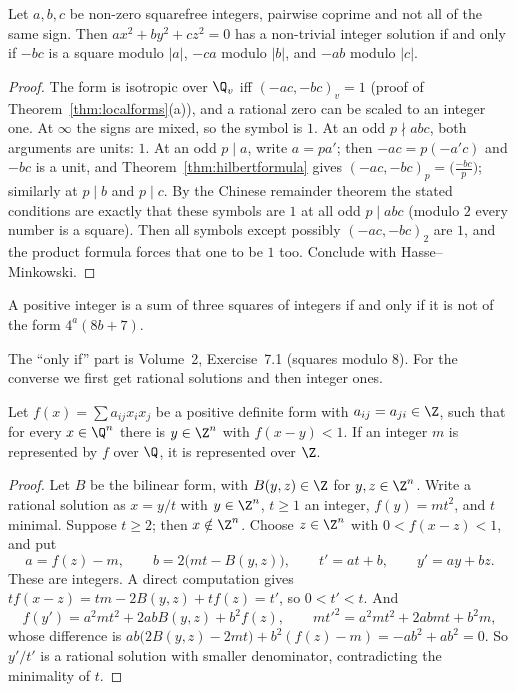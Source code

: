 \begin{theorem}[Legendre, 1785]\label{thm:legendre3}
Let $a,b,c$ be non-zero squarefree integers, pairwise coprime and not all of the same sign. Then $ax^2+by^2+cz^2=0$ has a
non-trivial integer solution if and only if $-bc$ is a square modulo $|a|$, $-ca$ modulo $|b|$, and $-ab$ modulo $|c|$.
\end{theorem}
\begin{proof}
The form is isotropic over $\Q_v$ iff $(-ac,-bc)_v=1$ (proof of Theorem~\ref{thm:localforms}(a)), and a rational zero can be scaled to
an integer one. At $\infty$ the signs are mixed, so the symbol is $1$. At an odd $p\nmid abc$, both arguments are units: $1$. At
an odd $p\mid a$, write $a=pa'$; then $-ac=p(-a'c)$ and $-bc$ is a unit, and Theorem~\ref{thm:hilbertformula} gives $(-ac,-bc)_p=
\bigl(\frac{-bc}p\bigr)$; similarly at $p\mid b$ and $p\mid c$. By the Chinese remainder theorem the stated conditions are exactly
that these symbols are $1$ at all odd $p\mid abc$ (modulo $2$ every number is a square). Then all symbols except possibly
$(-ac,-bc)_2$ are $1$, and the product formula forces that one to be $1$ too. Conclude with Hasse--Minkowski.
\end{proof}

\begin{theorem}\label{thm:threesq}
A positive integer is a sum of three squares of integers if and only if it is not of the form $4^a(8b+7)$.
\end{theorem}

The ``only if'' part is Volume~2, Exercise~7.1 (squares modulo $8$). For the converse we first get rational solutions and then
integer ones.

\begin{lemma}\label{lem:dc}
Let $f(x)=\sum a_{ij}x_ix_j$ be a positive definite form with $a_{ij}=a_{ji}\in\Z$, such that for every $x\in\Q^n$ there is $y\in
\Z^n$ with $f(x-y)<1$. If an integer $m$ is represented by $f$ over $\Q$, it is represented over $\Z$.
\end{lemma}
\begin{proof}
Let $B$ be the bilinear form, with $B(y,z)\in\Z$ for $y,z\in\Z^n$. Write a rational solution as $x=y/t$ with $y\in\Z^n$, $t\ge1$
an integer, $f(y)=mt^2$, and $t$ minimal. Suppose $t\ge2$; then $x\notin\Z^n$. Choose $z\in\Z^n$ with $0<f(x-z)<1$, and put
\[
a=f(z)-m,\qquad b=2\bigl(mt-B(y,z)\bigr),\qquad t'=at+b,\qquad y'=ay+bz.
\]
These are integers. A direct computation gives $tf(x-z)=tm-2B(y,z)+tf(z)=t'$, so $0<t'<t$. And
\[
f(y')=a^2mt^2+2abB(y,z)+b^2f(z),\qquad mt'^2=a^2mt^2+2abmt+b^2m,
\]
whose difference is $ab\bigl(2B(y,z)-2mt\bigr)+b^2(f(z)-m)=-ab^2+ab^2=0$. So $y'/t'$ is a rational solution with smaller
denominator, contradicting the minimality of $t$.
\end{proof}

